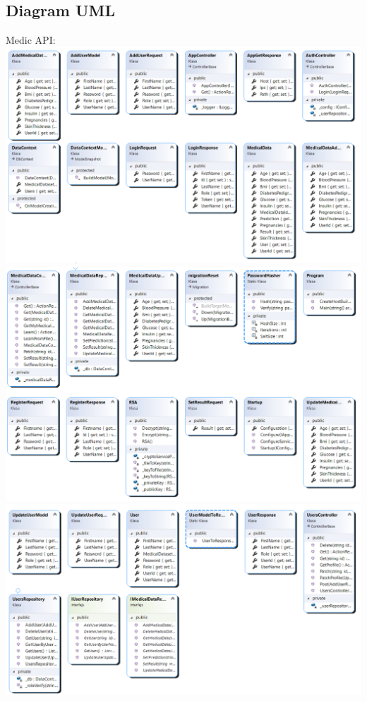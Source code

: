 \documentclass[12pt,a4paper]{article}
\begin{document}
	\subsection*{Diagram UML}
Medic API: \newline
\includegraphics[scale=0.6]{diagram1.png} \newpage
\includegraphics[scale=0.6]{diagram2.png} \newline
\includegraphics[scale=0.6]{diagram3.png} \newpage
\end{document}
